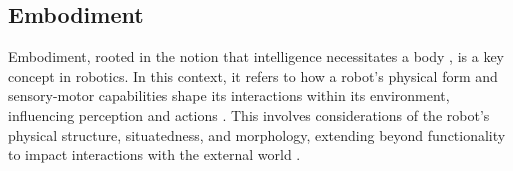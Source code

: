 \subsection{Embodiment}





Embodiment, rooted in the notion that intelligence necessitates a body \cite{Pfeifer2006Howbodyshapes}, is a key concept in robotics. In this context, it refers to how a robot's physical form and sensory-motor capabilities shape its interactions within its environment, influencing perception and actions \cite{Duffy2000Intelligentrobotsquestion}. This involves considerations of the robot's physical structure, situatedness, and morphology, extending beyond functionality to impact interactions with the external world \cite{Miller2018EmbodimentSituatednessMorphology}.

